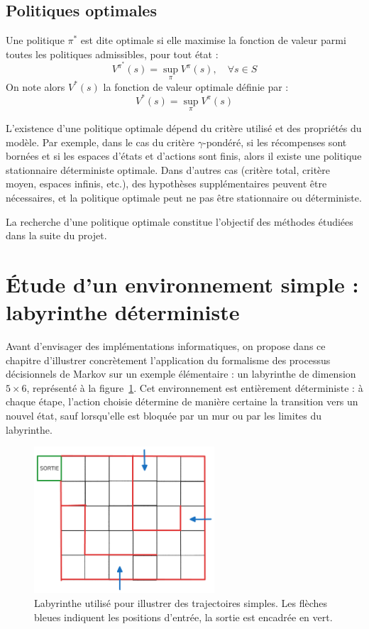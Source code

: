 \documentclass[12pt]{article}
\begin{document}
\subsection{Politiques optimales}

Une politique \(\pi^*\) est dite optimale si elle maximise la fonction de valeur parmi toutes les politiques admissibles, pour tout état :
\[
V^{\pi^*}(s) = \sup_{\pi} V^\pi(s), \quad \forall s \in S
\]
On note alors \(V^*(s)\) la fonction de valeur optimale définie par :
\[
V^*(s) = \sup_{\pi} V^\pi(s)
\]

L’existence d’une politique optimale dépend du critère utilisé et des propriétés du modèle. Par exemple, dans le cas du critère \(\gamma\)-pondéré, si les récompenses sont bornées et si les espaces d’états et d’actions sont finis, alors il existe une politique stationnaire déterministe optimale. Dans d’autres cas (critère total, critère moyen, espaces infinis, etc.), des hypothèses supplémentaires peuvent être nécessaires, et la politique optimale peut ne pas être stationnaire ou déterministe.

La recherche d’une politique optimale constitue l’objectif des méthodes étudiées dans la suite du projet.

\section{Étude d’un environnement simple : labyrinthe déterministe}


Avant d’envisager des implémentations informatiques, on propose dans ce chapitre d’illustrer concrètement l’application du formalisme des processus décisionnels de Markov sur un exemple élémentaire : un labyrinthe de dimension $5 \times 6$, représenté à la figure~\ref{fig:labyrinthe}. Cet environnement est entièrement déterministe : à chaque étape, l’action choisie détermine de manière certaine la transition vers un nouvel état, sauf lorsqu’elle est bloquée par un mur ou par les limites du labyrinthe.

\begin{figure}[h]
    \centering
    \includegraphics[width=0.6\textwidth]{labyrinthevierge.png}
    \caption{Labyrinthe utilisé pour illustrer des trajectoires simples. Les flèches bleues indiquent les positions d’entrée, la sortie est encadrée en vert.}
    \label{fig:labyrinthe}
\end{figure}
\end{document}
